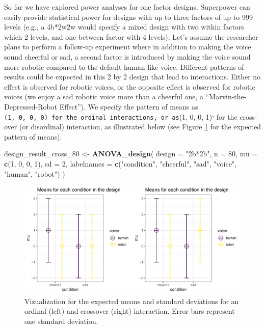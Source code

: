 \documentclass[,man,floatsintext]{apa6}
\newenvironment{Shaded}{\begin{snugshade}}{\end{snugshade}}
\newcommand{\DataTypeTok}[1]{\textcolor[rgb]{0.13,0.29,0.53}{#1}}
\newcommand{\DecValTok}[1]{\textcolor[rgb]{0.00,0.00,0.81}{#1}}
\newcommand{\KeywordTok}[1]{\textcolor[rgb]{0.13,0.29,0.53}{\textbf{#1}}}
\newcommand{\NormalTok}[1]{#1}
\newcommand{\StringTok}[1]{\textcolor[rgb]{0.31,0.60,0.02}{#1}}
\begin{document}
So far we have explored power analyses for one factor designs.
Superpower can easily provide statistical power for designs with up to three factors of up to 999 levels (e.g., a 4b*2w2w would specify a mixed design with two within factors which 2 levels, and one between factor with 4 levels).
Let's assume the researcher plans to perform a follow-up experiment where in addition to making the voice sound cheerful or sad, a second factor is introduced by making the voice sound more robotic compared to the default human-like voice.
Different patterns of results could be expected in this 2 by 2 design that lead to interactions.
Either no effect is observed for robotic voices, or the opposite effect is observed for robotic voices (we enjoy a sad robotic voice more than a cheerful one, a \enquote{Marvin-the-Depressed-Robot Effect}).
We specify the pattern of means as \texttt{(1,\ 0,\ 0,\ 0)\ for\ the\ ordinal\ interactions,\ or\ as}(1, 0, 0, 1)` for the cross-over (or disordinal) interaction, as illustrated below (see Figure \ref{fig:mean-plot} for the expected pattern of means).

\begin{Shaded}
\begin{Highlighting}[]
\NormalTok{design_result_cross_}\DecValTok{80}\NormalTok{ <-}\StringTok{ }\KeywordTok{ANOVA_design}\NormalTok{(}
  \DataTypeTok{design =} \StringTok{"2b*2b"}\NormalTok{,}
  \DataTypeTok{n =} \DecValTok{80}\NormalTok{,}
  \DataTypeTok{mu =} \KeywordTok{c}\NormalTok{(}\DecValTok{1}\NormalTok{, }\DecValTok{0}\NormalTok{, }\DecValTok{0}\NormalTok{, }\DecValTok{1}\NormalTok{),}
  \DataTypeTok{sd =} \DecValTok{2}\NormalTok{,}
  \DataTypeTok{labelnames =} \KeywordTok{c}\NormalTok{(}\StringTok{"condition"}\NormalTok{, }\StringTok{"cheerful"}\NormalTok{, }\StringTok{"sad"}\NormalTok{, }
                 \StringTok{"voice"}\NormalTok{, }\StringTok{"human"}\NormalTok{, }\StringTok{"robot"}\NormalTok{)}
\NormalTok{)}
\end{Highlighting}
\end{Shaded}

\begin{figure}
\centering
\includegraphics{0.1_Simulation_Based_Power_Analysis_For_Factorial_ANOVA_Designs_files/figure-latex/mean-plot-1.pdf}
\caption{\label{fig:mean-plot}Vizualization for the expected means and standard deviations for an ordinal (left) and crossover (right) interaction. Error bars represent one standard deviation.}
\end{figure}
\end{document}
